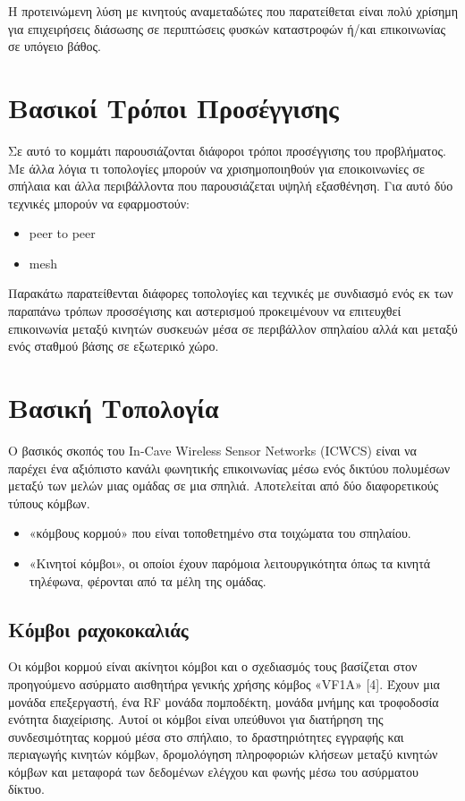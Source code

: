 \documentclass[12pt]{article}
\begin{document}
\begin{multicols}{2}
        Η προτεινώμενη λύση με κινητούς αναμεταδώτες
        που παρατείθεται είναι πολύ χρίσημη για 
        επιχειρήσεις διάσωσης σε περιπτώσεις
        φυσκών καταστροφών ή/και επικοινωνίας
        σε υπόγειο βάθος.

    \section{\normalsize \textsf{Βασικοί Τρόποι Προσέγγισης}}
        Σε αυτό το κομμάτι παρουσιάζονται διάφοροι τρόποι
        προσέγγισης του προβλήματος. Με άλλα λόγια τι
        τοπολογίες μπορούν να χρισημοποιηθούν για
        εποικοινωνίες σε σπήλαια και άλλα περιβάλλοντα που
        παρουσιάζεται υψηλή εξασθένηση. Για αυτό δύο
        τεχνικές μπορούν να εφαρμοστούν:
    \begin{itemize}
        \item peer to peer
        \item mesh
    \end{itemize}

    Παρακάτω παρατείθενται διάφορες τοπολογίες και τεχνικές
    με συνδιασμό ενός εκ των παραπάνω τρόπων προσσέγισης και
    αστερισμού προκειμένουν να επιτευχθεί επικοινωνία μεταξύ
    κινητών συσκευών μέσα σε περιβάλλον σπηλαίου αλλά και
    μεταξύ ενός σταθμού βάσης σε εξωτερικό χώρο.

    \section{\normalsize  \textsf{Βασική Τοπολογία}} Ο
    βασικός σκοπός του In-Cave Wireless Sensor Networks
    (ICWCS) είναι να παρέχει ένα αξιόπιστο κανάλι φωνητικής
    επικοινωνίας μέσω ενός δικτύου πολυμέσων μεταξύ των
    μελών μιας ομάδας σε μια σπηλιά. Αποτελείται από δύο
    διαφορετικούς τύπους κόμβων. 
    \begin{itemize}
        \item «κόμβους κορμού» που είναι τοποθετημένο στα
        τοιχώματα του σπηλαίου.
        \item «Κινητοί κόμβοι», οι οποίοι έχουν παρόμοια
        λειτουργικότητα όπως τα κινητά τηλέφωνα, φέρονται
        από τα μέλη της ομάδας.
    \end{itemize}

    \subsection{\small \textsf{Κόμβοι ραχοκοκαλιάς}}{ Οι
        κόμβοι κορμού είναι ακίνητοι κόμβοι και ο σχεδιασμός
        τους βασίζεται στον προηγούμενο ασύρματο αισθητήρα
        γενικής χρήσης κόμβος «VF1A» [4]. Έχουν μια μονάδα
        επεξεργαστή, ένα RF μονάδα πομποδέκτη, μονάδα μνήμης
        και τροφοδοσία ενότητα διαχείρισης. Αυτοί οι κόμβοι
        είναι υπεύθυνοι για διατήρηση της συνδεσιμότητας
        κορμού μέσα στο σπήλαιο, το δραστηριότητες εγγραφής
        και περιαγωγής κινητών κόμβων, δρομολόγηση
        πληροφοριών κλήσεων μεταξύ κινητών κόμβων και
        μεταφορά των δεδομένων ελέγχου και φωνής μέσω του
        ασύρματου δίκτυο.}\\ 

\end{multicols}
\end{document}
